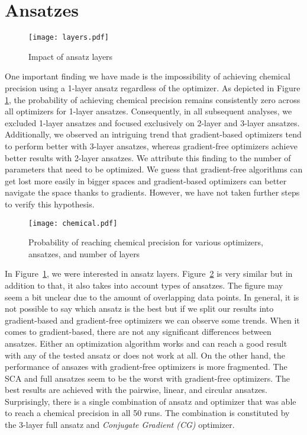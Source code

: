 \section{Ansatzes}
\begin{figure}[H]
    \centering
    \texttt{[image: layers.pdf]}
    \caption{Impact of ansatz layers}
    \label{fig:ansatz-layers}
\end{figure}
One important finding we have made is the impossibility of achieving chemical precision using a 1-layer ansatz regardless of the optimizer. As depicted in Figure \ref{fig:ansatz-layers}, the probability of achieving chemical precision remains consistently zero across all optimizers for 1-layer ansatzes. Consequently, in all subsequent analyses, we excluded 1-layer ansatzes and focused exclusively on 2-layer and 3-layer ansatzes. Additionally, we observed an intriguing trend that gradient-based optimizers tend to perform better with 3-layer ansatzes, whereas gradient-free optimizers achieve better results with 2-layer ansatzes. We attribute this finding to the number of parameters that need to be optimized. We guess that gradient-free algorithms can get lost more easily in bigger spaces and gradient-based optimizers can better navigate the space thanks to gradients. However, we have not taken further steps to verify this hypothesis. 

\begin{figure}[H]
    \centering
    \texttt{[image: chemical.pdf]}
    \caption{Probability of reaching chemical precision for various optimizers, ansatzes, and number of layers}
    \label{fig:chemical}
\end{figure}

In Figure~\ref{fig:ansatz-layers}, we were interested in ansatz layers. Figure~\ref{fig:chemical} is very similar but in addition to that, it also takes into account types of ansatzes. The figure may seem a bit unclear due to the amount of overlapping data points. In general, it is not possible to say which ansatz is the best but if we split our results into gradient-based and gradient-free optimizers we can observe some trends. When it comes to gradient-based, there are not any significant differences between ansatzes. Either an optimization algorithm works and can reach a good result with any of the tested ansatz or does not work at all. On the other hand, the performance of ansazes with gradient-free optimizers is more fragmented. The SCA and full ansatzes seem to be the worst with gradient-free optimizers. The best results are achieved with the pairwise, linear, and circular ansatzes. Surprisingly, there is a single combination of ansatz and optimizer that was able to reach a chemical precision in all 50 runs. The combination is constituted by the 3-layer full ansatz and \textit{Conjugate Gradient (CG)} optimizer.


